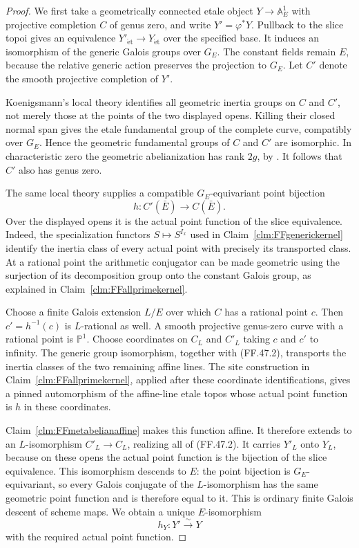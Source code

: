 \begin{proof}
We first take a geometrically connected etale object
\(Y\to\mathbb A^1_E\) with projective completion
\(C\) of genus zero, and write
\(Y'=\varphi^*Y\). Pullback to the slice topoi gives
an equivalence \(Y'_{\mathrm{\acute et}}\to
Y_{\mathrm{\acute et}}\) over the specified base.
It induces an isomorphism of the generic Galois groups
over \(G_E\). The constant fields remain \(E\),
because the relative generic action preserves the
projection to \(G_E\). Let \(C'\) denote the smooth
projective completion of \(Y'\).

Koenigsmann's local theory identifies all geometric
inertia groups on \(C\) and \(C'\), not merely those
at the points of the two displayed opens. Killing their
closed normal span gives the etale fundamental group of
the complete curve, compatibly over \(G_E\). Hence
the geometric fundamental groups of \(C\) and \(C'\)
are isomorphic. In characteristic zero the geometric
abelianization has rank \(2g\), by
\citet[Expos\'e~XIII, Corollary~2.12]{FF_SGA1}.
It follows that \(C'\) also has genus zero.

The same local theory supplies a compatible
\(G_E\)-equivariant point bijection
\[
                         h:C'(\bar E)\longrightarrow C(\bar E).
                                                        \tag{FF.47.2}
\]
Over the displayed opens it is the actual point function
of the slice equivalence. Indeed, the specialization
functors \(S\mapsto S^{I_x}\) used in
Claim~\ref{clm:FFgenerickernel} identify the inertia
class of every actual point with precisely its transported
class. At a rational point the arithmetic conjugator can
be made geometric using the surjection of its decomposition
group onto the constant Galois group, as explained in
Claim~\ref{clm:FFallprimekernel}.

Choose a finite Galois extension \(L/E\) over which
\(C\) has a rational point \(c\). Then
\(c'=h^{-1}(c)\) is \(L\)-rational as well.
A smooth projective genus-zero curve with a rational
point is \(\mathbb P^1\). Choose coordinates on
\(C_L\) and \(C'_L\) taking \(c\) and \(c'\)
to infinity. The generic group isomorphism, together
with (FF.47.2), transports the inertia classes of the
two remaining affine lines. The site construction in
Claim~\ref{clm:FFallprimekernel}, applied after these
coordinate identifications, gives a pinned automorphism
of the affine-line etale topos whose actual point function
is \(h\) in these coordinates.

Claim~\ref{clm:FFmetabelianaffine} makes this function
affine. It therefore extends to an \(L\)-isomorphism
\(C'_L\to C_L\), realizing all of (FF.47.2).
It carries \(Y'_L\) onto \(Y_L\), because on these
opens the actual point function is the bijection of the
slice equivalence. This isomorphism descends to \(E\):
the point bijection is \(G_E\)-equivariant, so every
Galois conjugate of the \(L\)-isomorphism has the same
geometric point function and is therefore equal to it.
This is ordinary finite Galois descent of scheme maps.
We obtain a unique \(E\)-isomorphism
\[
                                  h_Y:Y'\xrightarrow{\sim}Y
                                                        \tag{FF.47.3}
\]
with the required actual point function.


\end{proof}
